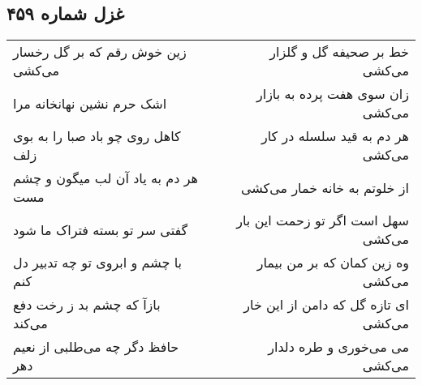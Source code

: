 \begin{center}
\section*{غزل شماره ۴۵۹}
\label{sec:sh459}
\begin{longtable}{l p{0.5cm} r}
زین خوش رقم که بر گل رخسار می‌کشی
&&
خط بر صحیفه گل و گلزار می‌کشی
\\
اشک حرم نشین نهانخانه مرا
&&
زان سوی هفت پرده به بازار می‌کشی
\\
کاهل روی چو باد صبا را به بوی زلف
&&
هر دم به قید سلسله در کار می‌کشی
\\
هر دم به یاد آن لب میگون و چشم مست
&&
از خلوتم به خانه خمار می‌کشی
\\
گفتی سر تو بسته فتراک ما شود
&&
سهل است اگر تو زحمت این بار می‌کشی
\\
با چشم و ابروی تو چه تدبیر دل کنم
&&
وه زین کمان که بر من بیمار می‌کشی
\\
بازآ که چشم بد ز رخت دفع می‌کند
&&
ای تازه گل که دامن از این خار می‌کشی
\\
حافظ دگر چه می‌طلبی از نعیم دهر
&&
می می‌خوری و طره دلدار می‌کشی
\\
\end{longtable}
\end{center}
